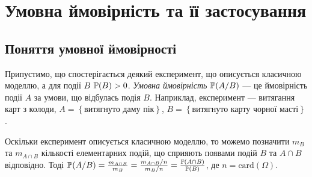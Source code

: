 \section{Умовна ймовірність та її застосування}

\subsection{Поняття умовної ймовірності}
Припустимо, що спостерігається деякий експеримент, що описується класичною моделлю, а для події $B$ $\P(B)>0$.
\emph{Умовна ймовірність} $\P(A/B)$ --- це ймовірність події $A$ за умови, що відбулась подія $B$.
Наприклад, експеримент --- витягання карт з колоди, $A=\left\{\text{витягнуто даму пік}\right\}$, $B=\left\{\text{витягнуто карту чорної масті}\right\}$.

Оскільки експеримент описується класичною моделлю, то можемо позначити $m_B$ та $m_{A\cap B}$ кількості елементарних подій, що сприяють появами подій $B$ та $A \cap B$ відповідно.
Тоді $\P(A/B) = \frac{m_{A\cap B}}{m_B} = \frac{m_{A\cap B}/n}{m_B/n} = \frac{\P(A\cap B)}{\P(B)}$, де $n = \mathrm{card}(\Omega)$.

